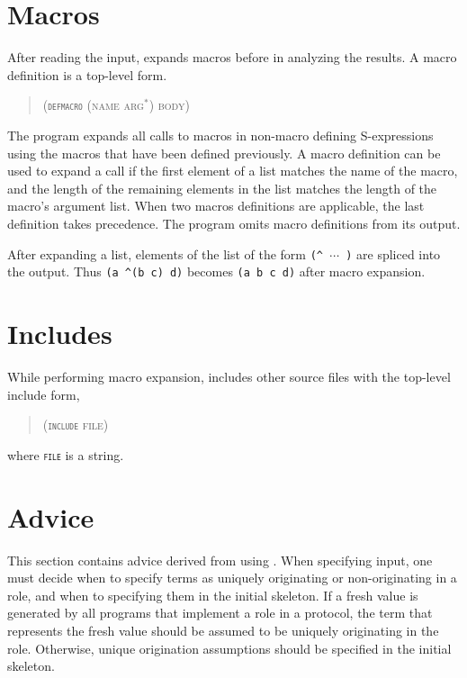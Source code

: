 \documentclass[12pt]{article}
\begin{document}
\section{Macros}\label{sec:macros}

After reading the input, {\cpsa} expands macros before in analyzing
the results. A macro definition is a top-level form.

\begin{quote}\scshape
(\texttt{\textup{defmacro}} (name arg${}^\ast$) body)
\end{quote}

The {\cpsa} program expands all calls to macros in non-macro defining
S-expressions using the macros that have been defined previously. A
macro definition can be used to expand a call if the first element of
a list matches the name of the macro, and the length of the remaining
elements in the list matches the length of the macro's argument
list. When two macros definitions are applicable, the last definition
takes precedence. The {\cpsa} program omits macro definitions from its
output.

After expanding a list, elements of the list of the form
\verb|(^ |$\cdots$\verb| )| are spliced into the output.  Thus
\verb|(a ^(b c) d)| becomes \verb|(a b c d)| after macro expansion.

\section{Includes}\label{sec:include}

While performing macro expansion, {\cpsa} includes other source files
with the top-level include form,
\begin{quote}\scshape
(\texttt{\textup{include}} file)
\end{quote}
where \texttt{\scshape file} is a string.

\section{Advice}\label{sec:advice}

This section contains advice derived from using {\cpsa}.  When
specifying {\cpsa} input, one must decide when to specify terms as
uniquely originating or non-originating in a role, and when to
specifying them in the initial skeleton.  If a fresh value is
generated by all programs that implement a role in a protocol, the
term that represents the fresh value should be assumed to be uniquely
originating in the role.  Otherwise, unique origination assumptions
should be specified in the initial skeleton.
\end{document}
